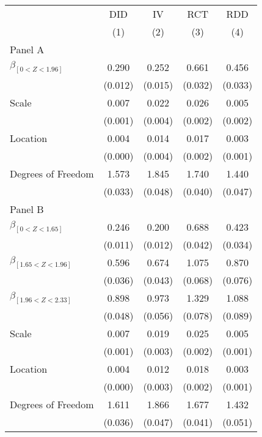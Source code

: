 \def\sym#1{\ifmmode^{#1}\else\(^{#1}\)\fi}
\begin{tabular}{l*{4}{c}}
\hline\hline
& \multicolumn{1}{c}{DID} &  \multicolumn{1}{c}{IV} &  \multicolumn{1}{c}{RCT} &  \multicolumn{1}{c}{RDD}\\

& \multicolumn{1}{c}{(1)} &  \multicolumn{1}{c}{(2)} &  \multicolumn{1}{c}{(3)} &  \multicolumn{1}{c}{(4)}\\

\hline
\hline

Panel A \\

$\beta_{[0 < Z < 1.96]}$ & 0.290 &  0.252 &  0.661 &  0.456\\
& (0.012) &  (0.015) &  (0.032) &  (0.033)\\

Scale & 0.007 &  0.022 &  0.026 &  0.005\\
& (0.001) &  (0.004) &  (0.002) &  (0.002)
\\

Location & 0.004 &  0.014 &  0.017 &  0.003\\
& (0.000) &  (0.004) &  (0.002) &  (0.001)
\\

Degrees of Freedom & 1.573 &  1.845 &  1.740 &  1.440\\
& (0.033) &  (0.048) &  (0.040) &  (0.047)\\
Panel B \\

$\beta_{[0 < Z < 1.65]}$ & 0.246 &  0.200 &  0.688 &  0.423\\
& (0.011) &  (0.012) &  (0.042) &  (0.034)\\

$\beta_{[1.65 < Z < 1.96]}$ & 0.596 &  0.674 &  1.075 &  0.870\\
& (0.036) &  (0.043) &  (0.068) &  (0.076)\\


$\beta_{[1.96 < Z < 2.33]}$ & 0.898 &  0.973 &  1.329 &  1.088\\
& (0.048) &  (0.056) &  (0.078) &  (0.089)\\

Scale & 0.007 &  0.019 &  0.025 &  0.005\\
& (0.001) &  (0.003) &  (0.002) &  (0.001)
\\

Location & 0.004 &  0.012 &  0.018 &  0.003\\
& (0.000) &  (0.003) &  (0.002) &  (0.001)
\\

Degrees of Freedom & 1.611 &  1.866 &  1.677 &  1.432\\
& (0.036) &  (0.047) &  (0.041) &  (0.051)\\

\hline\hline
\end{tabular}

